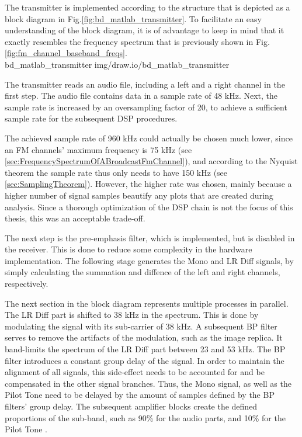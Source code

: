 The transmitter is implemented according to the structure that is depicted as a block diagram in Fig.\ref{fig:bd_matlab_transmitter}.
To facilitate an easy understanding of the block diagram, it is of advantage to keep in mind that it exactly resembles the frequency spectrum that is previously shown in Fig.\ref{fig:fm_channel_baseband_freqs}.\\

 {bd_matlab_transmitter} {img/draw.io/bd_matlab_transmitter}

The transmitter reads an audio file, including a left and a right channel in the first step.
The audio file contains data in a sample rate of 48 kHz.
Next, the sample rate is increased by an oversampling factor of 20, to achieve a sufficient sample rate for the subsequent DSP procedures.

The achieved sample rate of 960 kHz could actually be chosen much lower, since an FM channels' maximum frequency is 75 kHz (see \ref{sec:FrequencySpectrumOfABroadcastFmChannel}), and according to the Nyquist theorem the sample rate thus only needs to have 150 kHz (see \ref{sec:SamplingTheorem}).
However, the higher rate was chosen, mainly because a higher number of signal samples beautify any plots that are created during analysis.
Since a thorough optimization of the DSP chain is not the focus of this thesis, this was an acceptable trade-off.

The next step is the pre-emphasis filter, which is implemented, but is disabled in the receiver.
This is done to reduce some complexity in the hardware implementation.
The following stage generates the Mono and LR Diff signals, by simply calculating the summation and diffence of the left and right channels, respectively.

The next section in the block diagram represents multiple processes in parallel.
The LR Diff part is shifted to 38 kHz in the spectrum.
This is done by modulating the signal with its sub-carrier of 38 kHz.
A subsequent BP filter serves to remove the artifacts of the modulation, such as the image replica.
It band-limits the spectrum of the LR Diff part between 23 and 53 kHz.
The BP filter introduces a constant group delay of the signal.
In order to maintain the alignment of all signals, this side-effect needs to be accounted for and be compensated in the other signal branches.
Thus, the Mono signal, as well as the Pilot Tone need to be delayed by the amount of samples defined by the BP filters' group delay.
The subsequent amplifier blocks create the defined proportions of the sub-band, such as 90\% for the audio parts, and 10\% for the Pilot Tone \cite{FmMultiplexingForStereo}.

